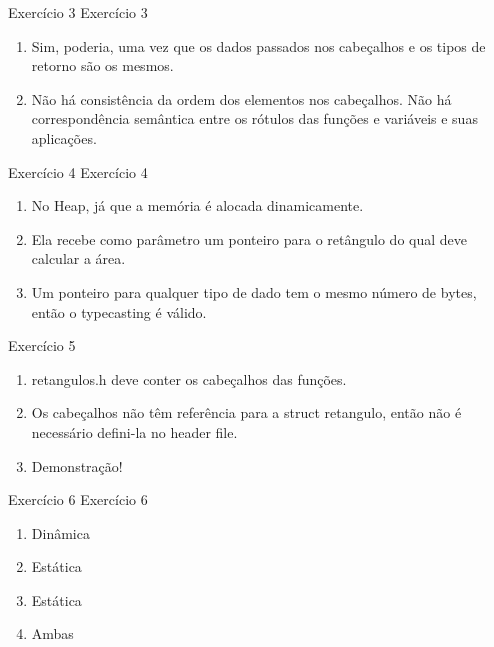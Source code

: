 \documentclass{beamer}
\begin{document}
\begin{frame}[fragile]{Exercício 3}
  \centering
  \Large
  Exercício 3
  \begin{enumerate}
    \item <2-> Sim, poderia, uma vez que os dados passados nos cabeçalhos e os
      tipos de retorno são os mesmos.
    \item <3-> Não há consistência da ordem dos elementos nos cabeçalhos. Não há
      correspondência semântica entre os rótulos das funções e variáveis e suas
      aplicações.
  \end{enumerate}
\end{frame}

\begin{frame}[fragile]{Exercício 4}
  \centering
  \Large
  Exercício 4
  \begin{enumerate}
    \item <2-> No Heap, já que a memória é alocada dinamicamente.
    \item <3-> Ela recebe como parâmetro um ponteiro para o retângulo do
      qual deve calcular a área.
    \item <4-> Um ponteiro para qualquer tipo de dado tem o mesmo número de
      bytes, então o typecasting é válido.
  \end{enumerate}
\end{frame}

\begin{frame}[fragile]{Exercício 5}
  \centering
  \Large
  \begin{enumerate}
  \item <2-> retangulos.h deve conter os cabeçalhos das funções.
  \item <3-> Os cabeçalhos não têm referência para a struct retangulo, então não
    é necessário defini-la no header file.
  \item <4-> Demonstração!
  \end{enumerate}
\end{frame}

\begin{frame}[fragile]{Exercício 6}
  \centering
  \Large
  Exercício 6
  \begin{enumerate}
    \item <2-> Dinâmica
    \item <3-> Estática
    \item <4-> Estática
    \item <5-> Ambas
  \end{enumerate}
\end{frame}
\end{document}
